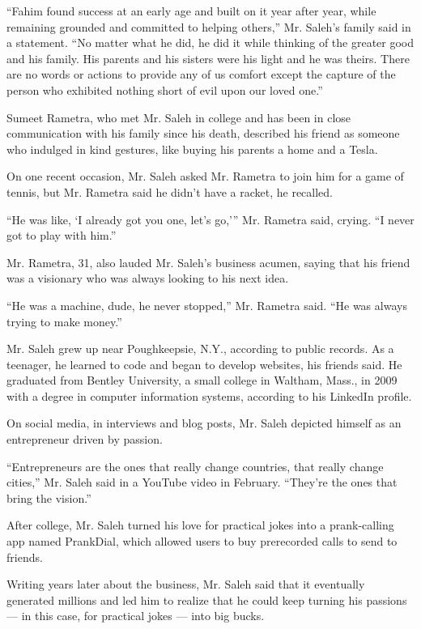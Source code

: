 ``Fahim found success at an early age and built on it year after year,
while remaining grounded and committed to helping others,'' Mr. Saleh's
family said in a statement. ``No matter what he did, he did it while
thinking of the greater good and his family. His parents and his sisters
were his light and he was theirs. There are no words or actions to
provide any of us comfort except the capture of the person who exhibited
nothing short of evil upon our loved one.''

Sumeet Rametra, who met Mr. Saleh in college and has been in close
communication with his family since his death, described his friend as
someone who indulged in kind gestures, like buying his parents a home
and a Tesla.

On one recent occasion, Mr. Saleh asked Mr. Rametra to join him for a
game of tennis, but Mr. Rametra said he didn't have a racket, he
recalled.

``He was like, `I already got you one, let's go,''' Mr. Rametra said,
crying. ``I never got to play with him.''

Mr. Rametra, 31, also lauded Mr. Saleh's business acumen, saying that
his friend was a visionary who was always looking to his next idea.

``He was a machine, dude, he never stopped,'' Mr. Rametra said. ``He was
always trying to make money.''

Mr. Saleh grew up near Poughkeepsie, N.Y., according to public records.
As a teenager, he learned to code and began to develop websites, his
friends said. He graduated from Bentley University, a small college in
Waltham, Mass., in 2009 with a degree in computer information systems,
according to his LinkedIn profile.

On social media, in interviews and blog posts, Mr. Saleh depicted
himself as an entrepreneur driven by passion.

``Entrepreneurs are the ones that really change countries, that really
change cities,'' Mr. Saleh said in a YouTube video in February.
``They're the ones that bring the vision.''

After college, Mr. Saleh turned his love for practical jokes into a
prank-calling app named PrankDial, which allowed users to buy
prerecorded calls to send to friends.

Writing years later about the business, Mr. Saleh said that it
eventually generated millions and led him to realize that he could keep
turning his passions --- in this case, for practical jokes --- into big
bucks.

